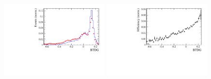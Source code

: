 \begin{figure}[h]
\centering
\includegraphics[height=!,width=0.49\textwidth]{figs/AcceptancePhspBDT/BDTG.pdf}
\includegraphics[height=!,width=0.49\textwidth]{figs/AcceptancePhspBDT/eff.pdf}
\caption{}
\label{fig:}
\end{figure}

